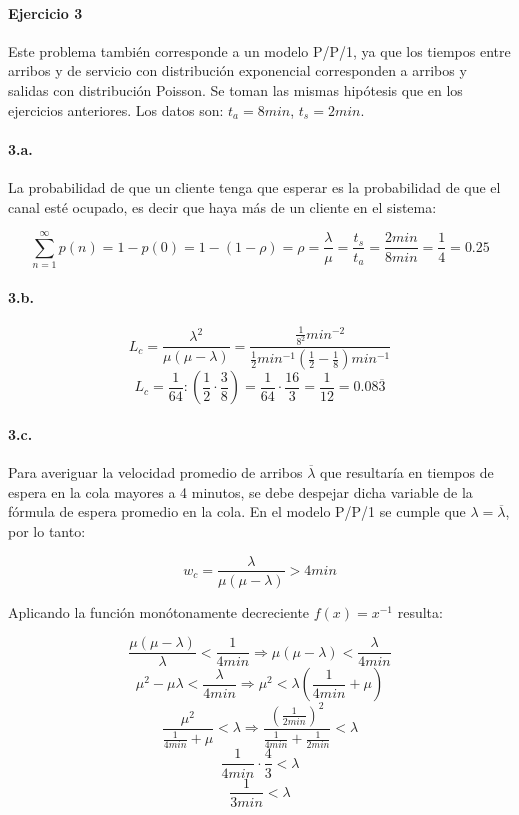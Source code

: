 \documentclass{article}
\begin{document}
\paragraph{Ejercicio 3}
    Este problema también corresponde a un modelo P/P/1, ya que los tiempos entre arribos y de servicio con distribución exponencial corresponden a arribos y salidas con distribución Poisson. Se toman las mismas hipótesis que en los ejercicios anteriores. Los datos son: $ t_a = 8min $, $ t_s = 2min $.

    \paragraph{3.a.} La probabilidad de que un cliente tenga que esperar es la probabilidad de que el canal esté ocupado, es decir que haya más de un cliente en el sistema:
    
    $$ \sum _{n=1}^{\infty} p(n) = 1 - p(0) = 1 - (1 - \rho) = \rho = \frac{\lambda}{\mu} = \frac{t_s}{t_a} = \frac{2min}{8min} = \frac{1}{4} = 0.25 $$    

    \paragraph{3.b.}
    $$ L_c = \frac{\lambda^2}{\mu(\mu - \lambda)} = \frac{\frac{1}{8^{2}} min^{-2}}{\frac{1}{2} min^{-1} \left( \frac{1}{2} - \frac{1}{8} \right) min^{-1}} $$
    $$ L_c = \frac{1}{64} :   \left( \frac{1}{2} \cdot \frac{3}{8} \right) = \frac{1}{64} \cdot \frac{16}{3} = \frac{1}{12} = 0.08\overline{3} $$

    \paragraph{3.c.} Para averiguar la velocidad promedio de arribos $ \overline \lambda $ que resultaría en tiempos de espera en la cola mayores a 4 minutos, se debe despejar dicha variable de la fórmula de espera promedio en la cola. En el modelo P/P/1 se cumple que $ \lambda = \overline \lambda $, por lo tanto:
    
    $$ w_c = \frac{\lambda}{\mu(\mu - \lambda)} > 4 min $$

    Aplicando la función monótonamente decreciente $ f(x) = x^{-1} $ resulta:

    $$ \frac{\mu(\mu - \lambda)}{\lambda} < \frac{1}{4min} \Rightarrow \mu(\mu - \lambda) < \frac{\lambda}{4min} $$
    $$ \mu^2 - \mu \lambda < \frac{\lambda}{4min} \Rightarrow \mu^2 < \lambda \left( \frac{1}{4min} + \mu \right) $$
    $$ \frac{\mu^2}{\frac{1}{4min} + \mu} < \lambda \Rightarrow \frac{\left( \frac{1}{2min} \right)^2}{\frac{1}{4min} + \frac{1}{2min}} < \lambda $$
    $$ \frac{1}{4min} \cdot \frac{4}{3} < \lambda $$
    $$ \frac{1}{3min} < \lambda $$
    
\end{document}
